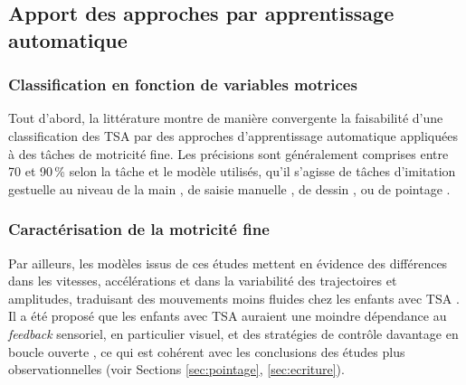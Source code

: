 \subsection{Apport des approches par apprentissage automatique}

\subsubsection{Classification en fonction de variables motrices}\label{sec:classification}

Tout d'abord, la littérature montre de manière convergente la faisabilité d'une classification des TSA par des approches d'apprentissage automatique appliquées à des tâches de motricité fine. Les précisions sont généralement comprises entre 70 et 90\,\% selon la tâche et le modèle utilisés, qu'il s'agisse de tâches d'imitation gestuelle au niveau de la main \parencite{Li2017Aug, FulinLiu2024Apr, vabalas_applying_2020}, de saisie manuelle \parencite{crippa_use_2015,Simeoli2021May,Milano2023May,Su2024Dec, freud_effective_2025, cavallo_identifying_2021}, de dessin \parencite{Emanuele2021Aug}, ou de pointage \parencite{Anzulewicz2016Aug, Luongo2024Apr, Doctor2025Jul}.

\subsubsection{Caractérisation de la motricité fine}
Par ailleurs, les modèles issus de ces études mettent en évidence des différences dans les vitesses, accélérations et dans la variabilité des trajectoires et amplitudes, traduisant des mouvements moins fluides chez les enfants avec TSA \parencite{Simeoli2021May, Milano2023May, Li2017Aug, Doctor2025Jul}. Il a été proposé que les enfants avec TSA auraient une moindre dépendance au \textit{feedback} sensoriel, en particulier visuel, et des stratégies de contrôle davantage en boucle ouverte \parencite{Emanuele2021Aug, crippa_use_2015, Anzulewicz2016Aug}, ce qui est cohérent avec les conclusions des études plus observationnelles (voir Sections \ref{sec:pointage}, \ref{sec:ecriture}).


\medskip

